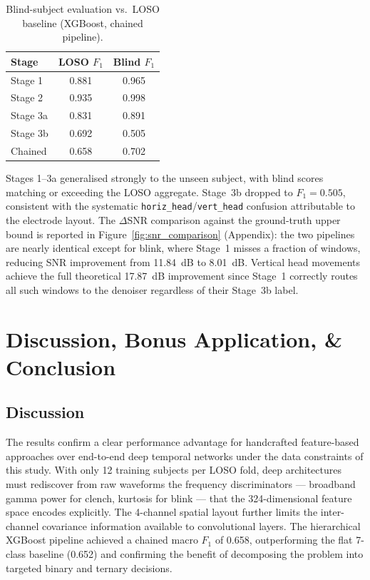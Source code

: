 \documentclass[11pt,a4paper]{article}
\begin{document}
\begin{table}[H]
\centering
\caption{Blind-subject evaluation vs.\ LOSO baseline (XGBoost, chained pipeline).}
\label{tab:blind_test}
\begin{tabular}{lcc}
\hline
\textbf{Stage} & \textbf{LOSO $F_1$} & \textbf{Blind $F_1$} \\ \hline
Stage 1   & 0.881 & 0.965 \\
Stage 2   & 0.935 & 0.998 \\
Stage 3a  & 0.831 & 0.891 \\
Stage 3b  & 0.692 & 0.505 \\
Chained   & 0.658 & 0.702 \\ \hline
\end{tabular}
\end{table}

Stages 1--3a generalised strongly to the unseen subject, with blind scores matching or exceeding the LOSO aggregate. Stage~3b dropped to $F_1 = 0.505$, consistent with the systematic \texttt{horiz\_head}/\texttt{vert\_head} confusion attributable to the electrode layout. The $\Delta$SNR comparison against the ground-truth upper bound is reported in Figure~\ref{fig:snr_comparison} (Appendix): the two pipelines are nearly identical except for blink, where Stage~1 misses a fraction of windows, reducing SNR improvement from 11.84~dB to 8.01~dB. Vertical head movements achieve the full theoretical 17.87~dB improvement since Stage~1 correctly routes all such windows to the denoiser regardless of their Stage~3b label.

\section{Discussion, Bonus Application, \& Conclusion}
\label{sec:discussion}

\subsection{Discussion}
The results confirm a clear performance advantage for handcrafted feature-based approaches over end-to-end deep temporal networks under the data constraints of this study. With only 12 training subjects per LOSO fold, deep architectures must rediscover from raw waveforms the frequency discriminators — broadband gamma power for clench, kurtosis for blink — that the 324-dimensional feature space encodes explicitly. The 4-channel spatial layout further limits the inter-channel covariance information available to convolutional layers. The hierarchical XGBoost pipeline achieved a chained macro $F_1$ of 0.658, outperforming the flat 7-class baseline (0.652) and confirming the benefit of decomposing the problem into targeted binary and ternary decisions.
\end{document}
